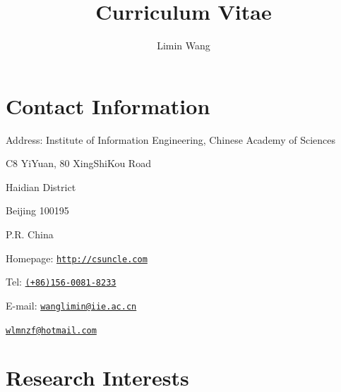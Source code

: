 \documentclass[11pt]{article}
\begin{document}
\title{%
{\sc Curriculum Vitae}}

\author{Limin Wang}

\date{\vspace{-.2cm}}



\maketitle

\section*{Contact Information}
\hspace{.52cm}Address: Institute of Information Engineering, Chinese Academy of Sciences

\hspace{1.54cm}C8 YiYuan, 80 XingShiKou Road

\hspace{1.54cm}Haidian District

\hspace{1.54cm}Beijing 100195

\hspace{1.54cm}P.R. China


Homepage: \href{http://csuncle.com/about/}{\tt http://csuncle.com}

\vspace{.2cm}
Tel: \href{(+86)156-0081-8233}{\tt (+86)156-0081-8233}
\vspace{.2cm}

E-mail: \href{wanglimin@iie.ac.cn}{\tt wanglimin@iie.ac.cn}

\hspace{1.40cm}\href{wlmnzf@hotmail.com}{\tt wlmnzf@hotmail.com}



\section*{Research Interests}
\end{document}
